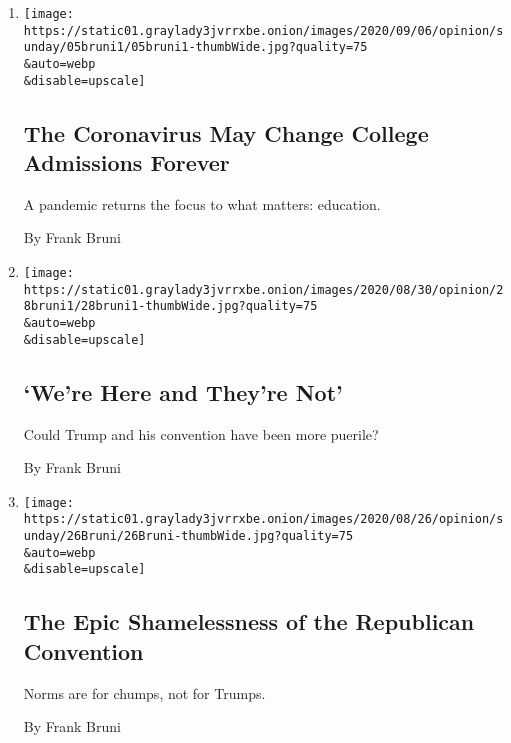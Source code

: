\begin{enumerate}
\def\labelenumi{\arabic{enumi}.}
\item
  \href{/2020/09/05/opinion/sunday/coronavirus-college-admissions.html}{}

  \texttt{[image: https://static01.graylady3jvrrxbe.onion/images/2020/09/06/opinion/sunday/05bruni1/05bruni1-thumbWide.jpg?quality=75\\\&auto=webp\\\&disable=upscale]}

  \hypertarget{the-coronavirus-may-change-college-admissions-forever}{%
  \subsection{The Coronavirus May Change College Admissions
  Forever}\label{the-coronavirus-may-change-college-admissions-forever}}

  A pandemic returns the focus to what matters: education.

  By Frank Bruni
\item
  \href{/2020/08/28/opinion/sunday/trump-rnc-speech.html}{}

  \texttt{[image: https://static01.graylady3jvrrxbe.onion/images/2020/08/30/opinion/28bruni1/28bruni1-thumbWide.jpg?quality=75\\\&auto=webp\\\&disable=upscale]}

  \hypertarget{were-here-and-theyre-not}{%
  \subsection{`We're Here and They're
  Not'}\label{were-here-and-theyre-not}}

  Could Trump and his convention have been more puerile?

  By Frank Bruni
\item
  \href{/2020/08/26/opinion/trump-melania-rnc.html}{}

  \texttt{[image: https://static01.graylady3jvrrxbe.onion/images/2020/08/26/opinion/sunday/26Bruni/26Bruni-thumbWide.jpg?quality=75\\\&auto=webp\\\&disable=upscale]}

  \hypertarget{the-epic-shamelessness-of-the-republican-convention}{%
  \subsection{The Epic Shamelessness of the Republican
  Convention}\label{the-epic-shamelessness-of-the-republican-convention}}

  Norms are for chumps, not for Trumps.

  By Frank Bruni


\end{enumerate}
